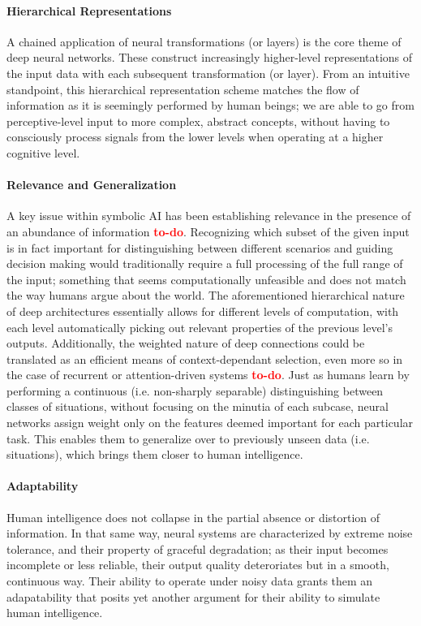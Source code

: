 \documentclass[]{article}
\newcommand\todo{\textcolor{red}{\bf{to-do}}}
\begin{document}
\paragraph{Hierarchical Representations}
A chained application of neural transformations (or layers) is the core theme of deep neural networks. These construct increasingly higher-level representations of the input data with each subsequent transformation (or layer). From an intuitive standpoint, this hierarchical representation scheme matches the flow of information as it is seemingly performed by human beings; we are able to go from perceptive-level input to more complex, abstract concepts, without having to consciously process signals from the lower levels when operating at a higher cognitive level.

\paragraph{Relevance and Generalization}
A key issue within symbolic AI has been establishing relevance in the presence of an abundance of information \todo. Recognizing which subset of the given input is in fact important for distinguishing between different scenarios and guiding decision making would traditionally require a full processing of the full range of the input; something that seems computationally unfeasible and does not match the way humans argue about the world. The aforementioned hierarchical nature of deep architectures essentially allows for different levels of computation, with each level automatically picking out relevant properties of the previous level's outputs. Additionally, the weighted nature of deep connections could be translated as an efficient means of context-dependant selection, even more so in the case of recurrent or attention-driven systems \todo . Just as humans learn by performing a continuous (i.e. non-sharply separable) distinguishing between classes of situations, without focusing on the minutia of each subcase, neural networks assign weight only on the features deemed important for each particular task. This enables them to generalize over to previously unseen data (i.e. situations), which brings them closer to human intelligence.

\paragraph{Adaptability}
Human intelligence does not collapse in the partial absence or distortion of information. In that same way, neural systems are characterized by extreme noise tolerance, and their property of graceful degradation; as their input becomes incomplete or less reliable, their output quality deteroriates but in a smooth, continuous way. Their ability to operate under noisy data grants them an adapatability that posits yet another argument for their ability to simulate human intelligence. 
\end{document}
